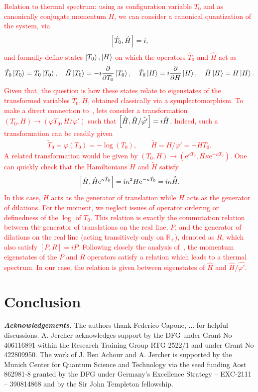 \documentclass[onecolumn,notitlepage,superscriptaddress, nofootinbib,nobibnotes, aps,prd,10pt]{revtex4-1}%
\newcommand{\R}{{\mathbb R}} %
\def\be{\begin{eqnarray}}
\def\ee{\end{eqnarray}}
\begin{document}
\textcolor{red}{Relation to thermal spectrum: using as configuration variable $T_0$ and as canonically conjugate momentum $H$, we can consider a canonical quantization of the system, via
\be
\comm{\hat{T}_0}{\hat{H}} = i,
\ee
and formally define states $\ket{T_0},\ket{H}$ on which the operators $\hat{T}_0$ and $\hat{H}$ act as
\be
\hat{T}_0\ket{T_0} = T_0 \ket{T_0},\quad \hat{H}\ket{T_0} = -i\pdv{}{T_0}\ket{T_0},\quad \hat{T}_0\ket{H} = i\pdv{}{H}\ket{H},\quad \hat{H}\ket{H} = H\ket{H}.
\ee
Given that, the question is how these states relate to eigenstates of the transformed variables $\tilde{T}_0,\tilde{H}$, obtained classically via a symplectomorphism. To make a direct connection to~\cite{Arzano:2018oby}, lets consider a transformation $(T_0,H)\rightarrow(\varphi{T}_0,H/\varphi')$ such that $\comm{\hat{H}}{\hat{H}/\hat{\varphi'}} = i\hat{H}$. Indeed, such a transformation can be readily given
\be
\tilde{T}_0 = \varphi(T_0) = -\log(T_0),\qquad \tilde{H} = H/\varphi' = -HT_0.
\ee
A related transformation would be given by $(T_0,H)\rightarrow (\mathrm{e}^{\kappa T_0}, H\kappa\mathrm{e}^{-\kappa T_0})$. One can quickly check that the Hamiltonians $H$ and $\tilde{H}$ satisfy
\be
\comm{\hat{H}}{\hat{H}\mathrm{e}^{\kappa\hat{T}_0}} = i\kappa^2 H\mathrm{e}^{-\kappa\hat{T}_0} = i\kappa\hat{\tilde{H}}.
\ee
In this case, $\tilde{H}$ acts as the generator of translation while $H$ acts as the generator of dilations.
For the moment, we neglect issues of operator ordering or definedness of the $\log$ of $T_0$.
This relation is exactly the commutation relation between the generator of translations on the real line, $P$, and the generator of dilations on the real line (acting transitively only on $\R_+$), denoted as $R$, which also satisfy $[P,R] = iP$.
Following closely the analysis of~\cite{Arzano:2018oby}, the momentum eigenstates of the $P$ and $R$ operators satisfy a relation which leads to a thermal spectrum. In our case, the relation is given between eigenstates of $\hat{H}$ and $\hat{H}/\hat{\varphi'}$.}



\section{Conclusion}

 \bigskip 

\noindent\textit{\textbf{Acknowledgements.}}
The authors thank Federico Capone, ... for helpful discussions. A. Jercher acknowledges support by the DFG under Grant No 406116891 within the Research Training Group RTG 2522/1 and under Grant No 422809950. The work of J. Ben Achour and A. Jercher is supported by the Munich Center for Quantum Science and Technology via the seed funding Aost 862981-8 granted by the DFG under Germany’s Excellence Strategy – EXC-2111 – 390814868 and by the Sir John Templeton fellowship.
\end{document}
